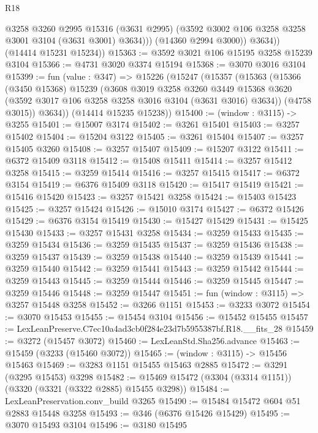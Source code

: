 \begin{lexlean}{R18}
\begin{coremodule}
                @3258
                @3260
                @2995
                @15316
                (@3631 @2995)
                (@3592 @3002 @106 @3258 @3258 @3001 @3104 (@3631 @3001) @3634)))
            (@14360 @2994 @3000))
          @3634))
      (@14414 @15231 @15234))
@15363 := @3592 @3021 @106 @15195 @3258 @15239 @3104
@15366 := @4731 @3020 @3374 @15194
@15368 := @3070 @3016 @3104
@15399 := fun (value : @347) =>
  @15226
    (@15247
      (@15357
        (@15363
          (@15366
            (@3450 @15368)
            @15239
            (@3608
              @3019
              @3258
              @3260
              @3449
              @15368
              @3620
              (@3592 @3017 @106 @3258 @3258 @3016 @3104 (@3631 @3016) @3634))
            (@4758 @3015))
          @3634))
      (@14414 @15235 @15238))
@15400 := (window : @3115) -> @3255
@15401 := @15007 @3174
@15402 := @3261 @15401
@15403 := @3257 @15402
@15404 := @15204 @3122
@15405 := @3261 @15404
@15407 := @3257 @15405 @3260
@15408 := @3257 @15407
@15409 := @15207 @3122
@15411 := @6372 @15409 @3118
@15412 := @15408 @15411
@15414 := @3257 @15412 @3258
@15415 := @3259 @15414
@15416 := @3257 @15415
@15417 := @6372 @3154
@15419 := @6376 @15409 @3118
@15420 := @15417 @15419
@15421 := @15416 @15420
@15423 := @3257 @15421 @3258
@15424 := @15403 @15423
@15425 := @3257 @15424
@15426 := @15010 @3174
@15427 := @6372 @15426
@15429 := @6376 @3154 @15419
@15430 := @15427 @15429
@15431 := @15425 @15430
@15433 := @3257 @15431 @3258
@15434 := @3259 @15433
@15435 := @3259 @15434
@15436 := @3259 @15435
@15437 := @3259 @15436
@15438 := @3259 @15437
@15439 := @3259 @15438
@15440 := @3259 @15439
@15441 := @3259 @15440
@15442 := @3259 @15441
@15443 := @3259 @15442
@15444 := @3259 @15443
@15445 := @3259 @15444
@15446 := @3259 @15445
@15447 := @3259 @15446
@15448 := @3259 @15447
@15451 := fun (window : @3115) => @3257 @15448 @3258
@15452 := @3266 @1151
@15453 := @3233 @3072
@15454 := @3070 @15453
@15455 := @15454 @3104
@15456 := @15452 @15455
@15457 := LexLeanPreserve.C7ec10a4ad3cb0f284e23d7b5955387bf.R18.__fits_28
@15459 := @3272 (@15457 @3072)
@15460 := LexLeanStd.Sha256.advance
@15463 := @15459 (@3233 (@15460 @3072))
@15465 := (window : @3115) -> @15456 @15463
@15469 := @3283 @1151 @15455 @15463 @2885
@15472 := @3291 (@3295 @15453) @3298
@15482 := @15469 @15472 (@3304 (@3314 @1151)) (@3320 (@3321 (@3322 @2885) @15455 @3298))
@15484 := LexLeanPreservation.conv_build @3265
@15490 := @15484 @15472 @604 @51 @2883 @15448 @3258
@15493 := @346 (@6376 @15426 @15429)
@15495 := @3070 @15493 @3104
@15496 := @3180 @15495

\end{coremodule}
\end{lexlean}
